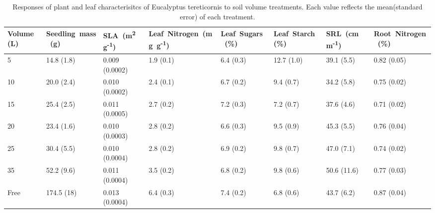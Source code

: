 \documentclass[a4paper]{article}\usepackage[]{graphicx}\usepackage[]{color}
\begin{document}
\begin{table}
\centering
\caption{Responses of plant and leaf characterisitcs of Eucalyptus tereticornis to soil volume treatments. Each value reflects the mean(standard error) of each treatment.} 
\label{table:Table1}
\begin{tabular}{llllllll}
  \hline
Volume (L) & Seedling~mass~(g) & SLA~(m\textsuperscript{2}~g\textsuperscript{-1}) & Leaf~Nitrogen~(mg~g\textsuperscript{-1}) & Leaf~Sugars~(\%) & Leaf~Starch~(\%) & SRL~(cm~m\textsuperscript{-1}) & Root~Nitrogen~(\%) \\ 
  \hline
5 & 14.8 (1.8) & 0.009 (0.0002) & 1.9 (0.1) & 6.4 (0.3) & 12.7 (1.0) & 39.1 (5.5) & 0.82 (0.05) \\ 
  10 & 20.0 (2.4) & 0.010 (0.0002) & 2.4 (0.1) & 6.7 (0.2) & 9.4 (0.7) & 34.2 (5.8) & 0.75 (0.02) \\ 
  15 & 25.4 (2.5) & 0.011 (0.0005) & 2.7 (0.2) & 7.2 (0.3) & 7.2 (0.7) & 37.6 (4.6) & 0.71 (0.02) \\ 
  20 & 23.4 (1.6) & 0.010 (0.0003) & 2.8 (0.2) & 6.6 (0.3) & 9.5 (0.9) & 45.3 (5.5) & 0.76 (0.04) \\ 
  25 & 30.4 (5.5) & 0.010 (0.0004) & 2.8 (0.2) & 6.9 (0.2) & 9.8 (0.7) & 47.0 (7.1) & 0.74 (0.02) \\ 
  35 & 52.2 (9.6) & 0.011 (0.0004) & 3.5 (0.2) & 6.8 (0.2) & 9.8 (0.6) & 50.6 (11.6) & 0.77 (0.03) \\ 
  Free & 174.5 (18) & 0.013 (0.0004) & 6.4 (0.3) & 7.4 (0.2) & 6.8 (0.6) & 43.7 (6.2) & 0.87 (0.04) \\ 
   \hline
\end{tabular}
\end{table}



\end{document}

